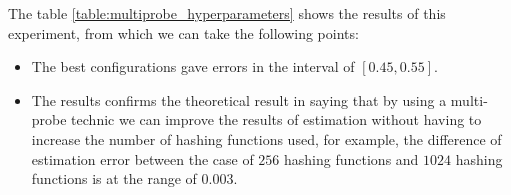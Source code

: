 The table \ref{table:multiprobe_hyperparameters} shows the results of this
experiment, from which we can take the following points:
\begin{itemize}
    \item The best configurations gave errors in the interval of $[0.45, 0.55]$.
    \item The results confirms the theoretical result in
          \citep{andoni_practicalsh_2015} saying that by using a multi-probe
          technic we can improve the results of estimation without having to
          increase the number of hashing functions used, for example, the
          difference of estimation error between the case of $256$ hashing
          functions and $1024$ hashing functions is at the range of $0.003$.
\end{itemize}


